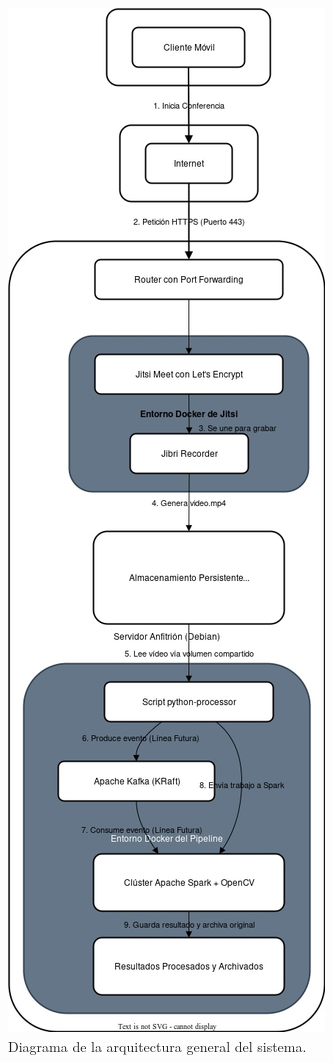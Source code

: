 \begin{figure}[H]
    \centering
    \includegraphics[height=\textheight]{img/arquitectura-general.jpg}
    \caption{Diagrama de la arquitectura general del sistema.}
    \label{fig:arquitectura_general}
\end{figure}

